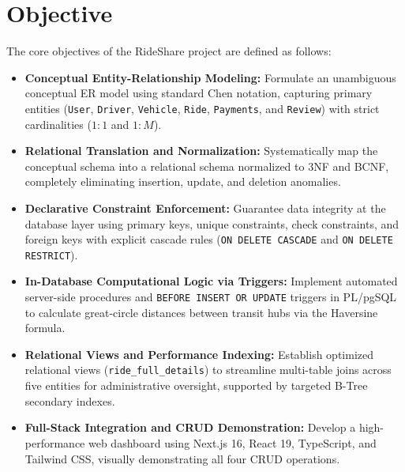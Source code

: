 \section{Objective}
The core objectives of the RideShare project are defined as follows:
\begin{itemize}[itemsep=1.5pt, topsep=2pt, parsep=0pt]
    \item \textbf{Conceptual Entity-Relationship Modeling:} Formulate an unambiguous conceptual ER model using standard Chen notation, capturing primary entities (\texttt{User}, \texttt{Driver}, \texttt{Vehicle}, \texttt{Ride}, \texttt{Payments}, and \texttt{Review}) with strict cardinalities ($1:1$ and $1:M$).
    \item \textbf{Relational Translation and Normalization:} Systematically map the conceptual schema into a relational schema normalized to 3NF and BCNF, completely eliminating insertion, update, and deletion anomalies.
    \item \textbf{Declarative Constraint Enforcement:} Guarantee data integrity at the database layer using primary keys, unique constraints, check constraints, and foreign keys with explicit cascade rules (\texttt{ON DELETE CASCADE} and \texttt{ON DELETE RESTRICT}).
    \item \textbf{In-Database Computational Logic via Triggers:} Implement automated server-side procedures and \texttt{BEFORE INSERT OR UPDATE} triggers in PL/pgSQL to calculate great-circle distances between transit hubs via the Haversine formula.
    \item \textbf{Relational Views and Performance Indexing:} Establish optimized relational views (\texttt{ride\_full\_details}) to streamline multi-table joins across five entities for administrative oversight, supported by targeted B-Tree secondary indexes.
    \item \textbf{Full-Stack Integration and CRUD Demonstration:} Develop a high-performance web dashboard using Next.js 16, React 19, TypeScript, and Tailwind CSS, visually demonstrating all four CRUD operations.
\end{itemize}

